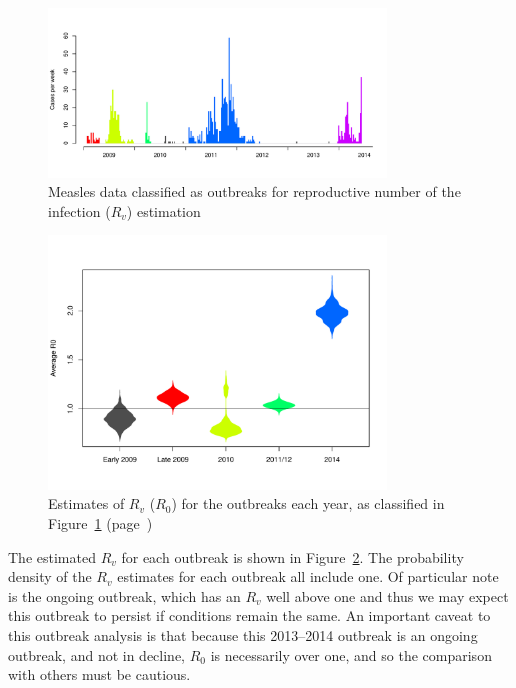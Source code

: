 \documentclass{article}
\begin{document}
{\begin{figure}
     \centering
     \includegraphics[width=0.8\textwidth]{outbreaks_for_R0.pdf}
     \caption{Measles data classified as outbreaks for reproductive number of the infection ($R_v$) estimation}
     \label{fig:outbreaks}
\end{figure}

\begin{figure}
     \centering
     \includegraphics[width=0.8\textwidth]{averageR0.pdf}
     \caption{Estimates of $R_v$ ($R_0$) for the outbreaks each year, as classified in Figure~\ref{fig:outbreaks} (page~\pageref{fig:outbreaks})}
     \label{fig:r0}
\end{figure}

The estimated $R_v$ for each outbreak is shown in Figure~\ref{fig:r0}. The probability density of the $R_v$ estimates for each outbreak all include one. Of particular note is the ongoing outbreak, which has an $R_v$ well above one and thus we may expect this outbreak to persist if conditions remain the same. An important caveat to this outbreak analysis is that because this 2013--2014 outbreak is an ongoing outbreak, and not in decline, $R_0$ is necessarily over one, and so the comparison with others must be cautious.

}
\end{document}
